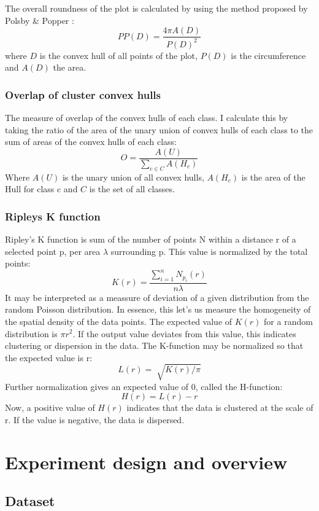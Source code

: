 \documentclass[11pt]{article}
\begin{document}
The overall roundness of the plot is calculated by using the method proposed by Polsby \& Popper \cite{popper}:
\[PP(D) = \frac{4 \pi A(D)}{P(D)^{2}} \]
where \(D\) is the convex hull of all points of the plot, \(P(D)\) is the circumference and \(A(D)\) the area.
\subsubsection{Overlap of cluster convex hulls}
\label{sec:org274a5d2}

The measure of overlap of the convex hulls of each class. I calculate this by taking the ratio of the area of the unary union of convex hulls of each class to the sum of areas of the convex hulls of each class:
\[ O = \frac{A(U)}{\sum_{c \in C}A(H_{c})} \]
Where \(A(U)\) is the unary union of all convex hulls, \(A(H_{c})\) is the area of the Hull for class c and \(C\) is the set of all classes.
\subsubsection{Ripleys K function}
\label{sec:org533d625}

Ripley's K function is sum of the number of points N within a distance r of a selected point p, per area \(\lambda\) surrounding p. This  value is normalized by the total points:
\[K(r) = \frac{\sum_{i=1}^{n}N_{p_{i}}(r)}{n \lambda}\]
It may be interpreted as a meassure of deviation of a given distribution from the random Poisson distribution. In essence, this let's us measure the homogeneity of the spatial density of the data points. The expected value of \(K(r)\) for a random distribution is \(\pi r^{2}\). If the output value deviates from this value, this indicates clustering or dispersion in the data. The K-function may be normalized so that the expected value is r:
\[L(r) = \sqrt[]{K(r)/\pi}\]
Further normalization gives an expected value of 0, called the H-function:
\[H(r) = L(r) - r\]
Now, a positive value of \(H(r)\) indicates that the data is clustered at the scale of r. If the value is negative, the data is dispersed.

\pagebreak

\section{Experiment design and overview}
\label{sec:orga220b5b}
\subsection{Dataset}
\label{sec:orgac308b8}
\end{document}
